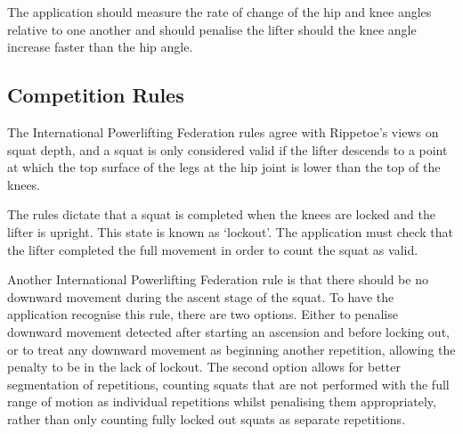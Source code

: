The application should measure the rate of change of the hip and knee angles relative to one another and should penalise the lifter should the knee angle increase faster than the hip angle.

\subsection{Competition Rules}

The International Powerlifting Federation rules\cite{ipf} agree with Rippetoe's views on squat depth, and a squat is only considered valid if the lifter descends to a point at which the top surface of the legs at the hip joint is lower than the top of the knees.

The rules dictate that a squat is completed when the knees are locked and the lifter is upright. This state is known as `lockout'. The application must check that the lifter completed the full movement in order to count the squat as valid.

Another International Powerlifting Federation rule is that there should be no downward movement during the ascent stage of the squat. To have the application recognise this rule, there are two options. Either to penalise downward movement detected after starting an ascension and before locking out, or to treat any downward movement as beginning another repetition, allowing the penalty to be in the lack of lockout. The second option allows for better segmentation of repetitions, counting squats that are not performed with the full range of motion as individual repetitions whilst penalising them appropriately, rather than only counting fully locked out squats as separate repetitions.